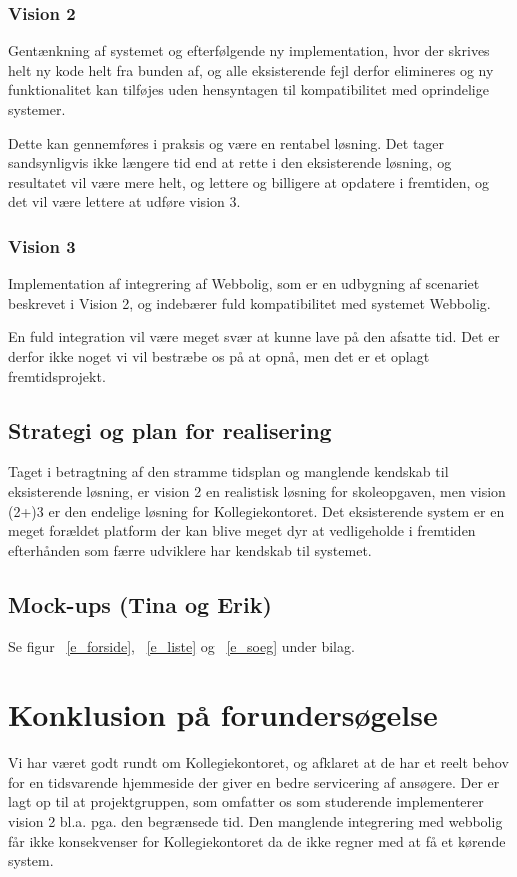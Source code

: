 \documentclass[12pt, a4paper]{report}
\begin{document}
\subsubsection{Vision 2}
Gentænkning af systemet og efterfølgende ny implementation, hvor der skrives helt ny kode helt fra bunden af, og alle eksisterende fejl derfor elimineres og ny funktionalitet kan tilføjes uden hensyntagen til kompatibilitet med oprindelige systemer.

Dette kan gennemføres i praksis og være en rentabel løsning. Det tager sandsynligvis ikke længere tid end at rette i den eksisterende løsning, og resultatet vil være mere helt, og lettere og billigere at opdatere i fremtiden, og det vil være lettere at udføre vision 3.

\subsubsection{Vision 3}
Implementation af integrering af Webbolig, som er en udbygning af scenariet beskrevet i Vision 2, og indebærer fuld kompatibilitet med systemet Webbolig.

En fuld integration vil være meget svær at kunne lave på den afsatte tid. Det er derfor ikke noget vi vil bestræbe os på at opnå, men det er et oplagt fremtidsprojekt.

\subsection{Strategi og plan for realisering}
Taget i betragtning af den stramme tidsplan og manglende kendskab til eksisterende løsning, er vision 2 en realistisk løsning for skoleopgaven, men vision (2+)3 er den endelige løsning for Kollegiekontoret. Det eksisterende system er en meget forældet platform der kan blive meget dyr at vedligeholde i fremtiden efterhånden som færre udviklere har kendskab til systemet.

\subsection{Mock-ups (Tina og Erik)}
Se figur ~\ref{e_forside}, ~\ref{e_liste} og ~\ref{e_soeg} under bilag.

\section{Konklusion på forundersøgelse}
Vi har været godt rundt om Kollegiekontoret, og afklaret at de har et reelt behov for en tidsvarende hjemmeside der giver en bedre servicering af ansøgere. Der er lagt op til at projektgruppen, som omfatter os som studerende implementerer vision 2 bl.a. pga. den begrænsede tid. Den manglende integrering med webbolig får ikke konsekvenser for Kollegiekontoret da de ikke regner med at få et kørende system.
\end{document}
